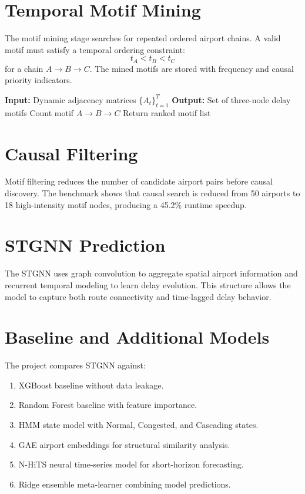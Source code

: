 \documentclass[12pt,a4paper]{report}
\begin{document}
\section{Temporal Motif Mining}
The motif mining stage searches for repeated ordered airport chains. A valid motif must satisfy a temporal ordering constraint:
\begin{equation}
	t_A < t_B < t_C
\end{equation}
for a chain $A \rightarrow B \rightarrow C$. The mined motifs are stored with frequency and causal priority indicators.

\begin{algorithm}[H]
\caption{Temporal Delay Motif Mining}
\begin{algorithmic}[1]
\State \textbf{Input:} Dynamic adjacency matrices $\{A_t\}_{t=1}^{T}$
\State \textbf{Output:} Set of three-node delay motifs
					\State Count motif $A \rightarrow B \rightarrow C$
				\EndIf
			\EndFor
		\EndFor
	\EndFor
\EndFor
\State Return ranked motif list
\end{algorithmic}
\end{algorithm}

\section{Causal Filtering}
Motif filtering reduces the number of candidate airport pairs before causal discovery. The benchmark shows that causal search is reduced from 50 airports to 18 high-intensity motif nodes, producing a 45.2\% runtime speedup.

\section{STGNN Prediction}
The STGNN uses graph convolution to aggregate spatial airport information and recurrent temporal modeling to learn delay evolution. This structure allows the model to capture both route connectivity and time-lagged delay behavior.

\section{Baseline and Additional Models}
The project compares STGNN against:
\begin{enumerate}
	\item XGBoost baseline without data leakage.
	\item Random Forest baseline with feature importance.
	\item HMM state model with Normal, Congested, and Cascading states.
	\item GAE airport embeddings for structural similarity analysis.
	\item N-HiTS neural time-series model for short-horizon forecasting.
	\item Ridge ensemble meta-learner combining model predictions.
\end{enumerate}
\end{document}
